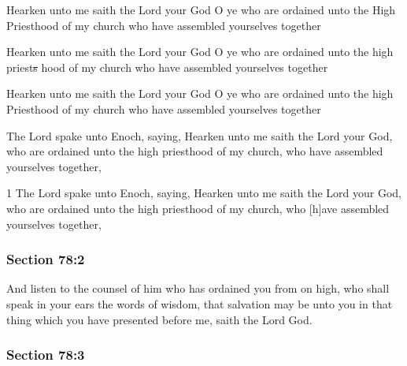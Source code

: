 		\begin{framed}
		\scriptsize
			\begin{compactdesc}
				\item[JSP] Hearken unto me saith the Lord your God O ye who are ordained unto the High Priesthood of my church who have assembled yourselves together
				\item[RB1] Hearken unto me saith the Lord your God O ye who are ordained unto the high priest\sout{s} hood of my church who have assembled yourselves together
				\item[RB2] Hearken unto me saith the Lord your God O ye who are ordained unto the high Priesthood of my church who have assembled yourselves together
				\item[DC 1835] The Lord spake unto Enoch, saying, Hearken unto me saith the Lord your God, who are ordained unto the high priesthood of my church, who have assembled yourselves together,
				\item[DC 1844] 1 The Lord spake unto Enoch, saying, Hearken unto me saith the Lord your God, who are ordained unto the high priesthood of my church, who [h]ave assembled yourselves together,
			\end{compactdesc}
		\end{framed}

	\subsubsection{Section 78:2} %
		\label{DC78-2}

		And listen to the counsel of him who has ordained you from on high, who shall speak in your ears the words of wisdom, that salvation may be unto you in that thing which you have presented before me, saith the Lord God.


	\subsubsection{Section 78:3} %
		\label{DC78-3}

